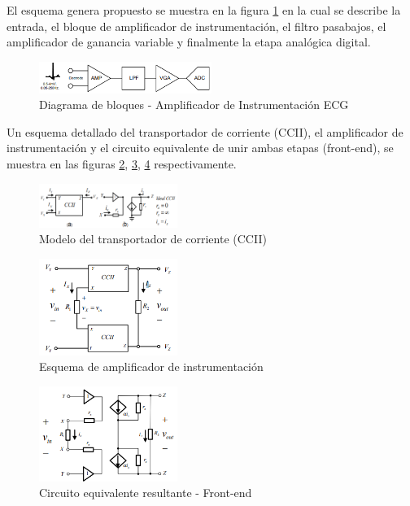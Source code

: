 \documentclass[conference]{IEEEtran}
\begin{document}
	El esquema genera propuesto se muestra en la figura \ref{fig:ecg-amplifier} en la cual se describe la entrada, el bloque de amplificador de instrumentación, el filtro pasabajos, el amplificador de ganancia variable y finalmente la etapa analógica digital.
	
	\begin{figure}[h]
		\centering
		\includegraphics[width=0.5\textwidth]{media/ecg-amplifier}
		\caption{Diagrama de bloques - Amplificador de Instrumentación ECG}
		\label{fig:ecg-amplifier}
	\end{figure}
	
	Un esquema detallado del transportador de corriente (CCII), el amplificador de instrumentación y el circuito equivalente de unir ambas etapas (front-end), se muestra en las figuras \ref{fig:transportador-corriente}, \ref{fig:ia-propuesto}, \ref{fig:circuito-equivalente} respectivamente.
		
	\begin{figure}[h]
		\centering
		\includegraphics[width=0.4\textwidth]{media/transportador-corriente}
		\caption{Modelo del transportador de corriente (CCII)}
		\label{fig:transportador-corriente}
	\end{figure}
	
	\begin{figure}[h]
		\centering
		\includegraphics[width=0.4\textwidth]{media/ia-propuesto}
		\caption{Esquema de amplificador de instrumentación}
		\label{fig:ia-propuesto}
	\end{figure}
	
	\begin{figure}[h]
		\centering
		\includegraphics[width=0.4\textwidth]{media/circuito-equivalente}
		\caption{Circuito equivalente resultante - Front-end}
		\label{fig:circuito-equivalente}
	\end{figure}
	
\end{document}
